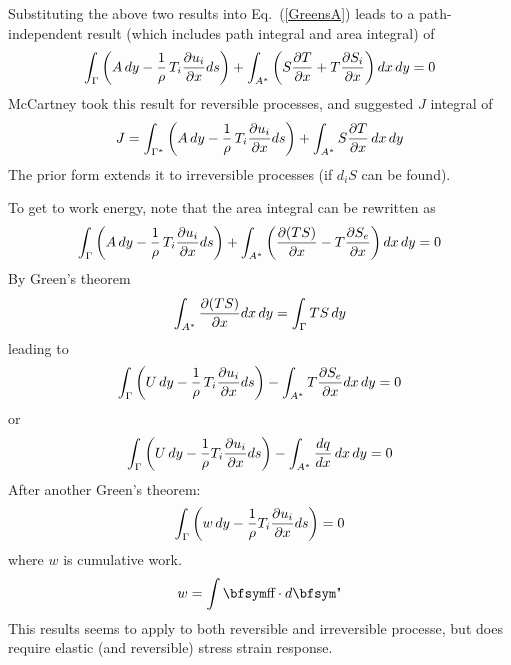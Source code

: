 \documentclass[11pt]{book}
\def\st{{\hbox{\bfsym\char'033}}}
\def\et{{\hbox{\bfsym\char'042}}}
\begin{document}
Substituting the above two results into Eq.~(\ref{GreensA}) leads to a path-independent result (which includes path integral and area integral) of
\begin{equation}%
           \int_\Gamma \left(A\thinspace dy - {1\over\rho}\thinspace T_i {\partial u_i\over \partial x} ds\right)
                        + \int_{A^*}  \left( S {\partial T\over\partial x} + T {\partial S_i\over\partial x} 
                            \right ) dx \thinspace dy = 0
\end{equation}%
McCartney took this result for reversible processes, and suggested $J$ integral of
\begin{equation}%
           J = \int_{\Gamma^*} \left(A\thinspace dy
                     - {1\over\rho}\thinspace T_i {\partial u_i\over \partial x} ds\right)
                        + \int_{A^*}  S {\partial T\over\partial x}\thinspace dx \thinspace dy
\end{equation}%
The prior form extends it to irreversible processes (if $d_iS$ can be found).

To get to work energy, note that the area integral can be rewritten as
\begin{equation}%
           \int_\Gamma \left(A\thinspace dy - {1\over\rho}\thinspace T_i {\partial u_i\over \partial x} ds\right)
                        + \int_{A^*}  \left(  {\partial( TS)\over\partial x} - T {\partial S_e\over\partial x} 
                            \right ) dx \thinspace dy = 0
\end{equation}%
By Green's theorem
\begin{equation}%
         \int_{A^*}    {\partial( TS)\over\partial x}  dx \thinspace dy = \int_\Gamma TS\thinspace dy
\end{equation}%
leading to
\begin{equation}%
           \int_\Gamma \left(U\thinspace dy - {1\over\rho}\thinspace T_i {\partial u_i\over \partial x} ds\right)
                        - \int_{A^*}  T {\partial S_e\over\partial x}  dx \thinspace dy = 0
\end{equation}%
or
\begin{equation}%
           \int_\Gamma \left( U\thinspace dy -  {1\over\rho} T_i {\partial u_i\over \partial x} ds\right)
                        - \int_{A^*}  {dq\over dx} \thinspace  dx \thinspace dy = 0
\end{equation}%
After another Green's theorem:
\begin{equation}%
           \int_\Gamma \left( w\thinspace dy -  {1\over\rho} T_i {\partial u_i\over \partial x} ds\right)
                         = 0
\end{equation}%
where $w$ is cumulative work.
\begin{equation}%
     w = \int \st \cdot d\et
 \end{equation}%
This results seems to apply to both reversible and irreversible processe, but does require elastic (and reversible) stress strain response.
\end{document}
